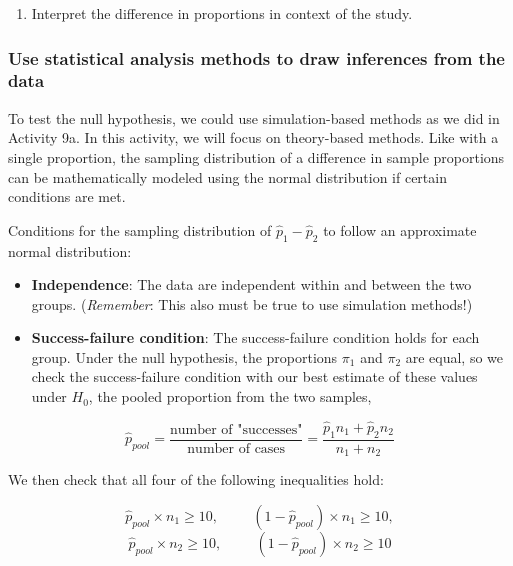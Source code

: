 \documentclass[
]{report}
\providecommand{\tightlist}{%
  \setlength{\itemsep}{0pt}\setlength{\parskip}{0pt}}
\begin{document}
\vspace{0.5in}

\begin{enumerate}
\def\labelenumi{\arabic{enumi}.}
\setcounter{enumi}{2}
\tightlist
\item
  Interpret the difference in proportions in context of the study.
  \vspace{0.8in}
\end{enumerate}

\hypertarget{use-statistical-analysis-methods-to-draw-inferences-from-the-data-3}{%
\subsubsection*{Use statistical analysis methods to draw inferences from the data}\label{use-statistical-analysis-methods-to-draw-inferences-from-the-data-3}}

To test the null hypothesis, we could use simulation-based methods as we did in Activity 9a. In this activity, we will focus on theory-based methods. Like with a single proportion, the sampling distribution of a difference in sample proportions can be mathematically modeled using the normal distribution if certain conditions are met.

Conditions for the sampling distribution of \(\hat{p}_1-\hat{p}_2\) to follow an approximate normal distribution:

\begin{itemize}
\item
  \textbf{Independence}: The data are independent within and between the two groups. (\emph{Remember}: This also must be true to use simulation methods!)
\item
  \textbf{Success-failure condition}: The success-failure condition holds for each group. Under the null hypothesis, the proportions \(\pi_1\) and \(\pi_2\) are equal, so we check the success-failure condition with our best estimate of these values under \(H_0\), the pooled proportion from the two samples,
\end{itemize}

\[
\hat{p}_{pool} = \frac{\text{number of "successes"}}{\text{number of cases}} = \frac{\hat{p}_1 n_1+\hat{p}_2 n_2}{n_1+n_2}
\]
\newpage

We then check that all four of the following inequalities hold:

\[\hat{p}_{pool} \times n_1 \ge 10, \hspace{1cm} (1 - \hat{p}_{pool}) \times n_1 \geq 10,\]
\[\hat{p}_{pool} \times n_2 \ge 10, \hspace{1cm} (1 - \hat{p}_{pool}) \times n_2 \geq 10\]
\end{document}
